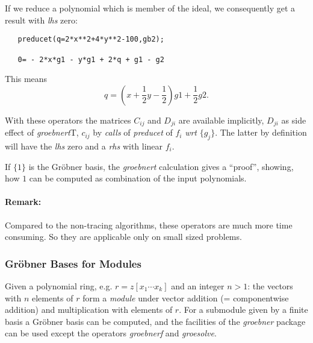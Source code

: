 If we reduce a polynomial which is member of the ideal, we
consequently get a result with {\it lhs} zero:
\begin{verbatim}
   preducet(q=2*x**2+4*y**2-100,gb2);

   0= - 2*x*g1 - y*g1 + 2*q + g1 - g2
\end{verbatim}

This means
\[ q = ( x + \frac{1}{2} y - \frac{1}{2}) g1 + \frac{1}{2} g2.
\]

With these operators the matrices $C_{ij}$ and $D_{ji}$ are available
implicitly, $D_{ji}$ as side effect of \emph{groebnert}T, $c_{ij}$ by {\it calls}
of \emph{preducet} of $f_i$ {\it wrt} $\{g_j\}$. The latter by definition will
have the {\it lhs} zero and a {\it rhs} with linear $f_i$.

If $\{1\}$ is the Gr\"obner basis, the \emph{groebnert} calculation gives
a ``proof'', showing,  how  $1$ can be computed as combination of the
input polynomials.

\paragraph{Remark:} Compared to the non-tracing algorithms, these
operators are much more time consuming. So they are applicable
only on small sized problems.

\subsubsection{Gr\"obner Bases for Modules}

Given a polynomial ring, e.g. $r=z[x_1 \cdots x_k]$ and
an integer $n>1$: the vectors with $n$ elements of $r$
form a \emph{module} under vector addition (= componentwise addition)
and multiplication with elements of $r$. For a submodule
given by a finite basis a Gr\"obner basis
can be computed, and the facilities of the \emph{groebner} package
can be used except the operators \emph{groebnerf} and \emph{groesolve}.

